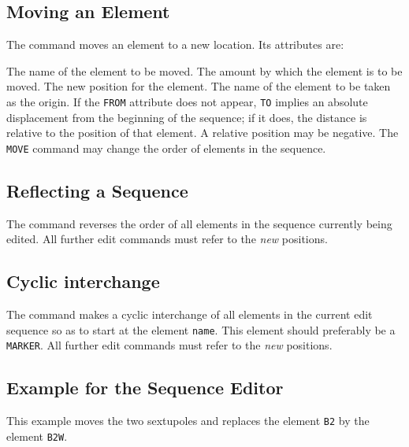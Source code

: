 \subsection{Moving an Element}
The command
moves an element to a new location.
Its attributes are:
\begin{mylist}
The name of the element to be moved.
The amount by which the element is to be moved.
The new position for the element.
The name of the element to be taken as the origin.
If the {\tt FROM} attribute does not appear,
{\tt TO} implies an absolute displacement from the beginning of the sequence;
if it does, the distance is relative to the position of that element.
A relative position may be negative.
The {\tt MOVE} command may change the order of elements in the sequence.
\end{mylist}
 
\subsection{Reflecting a Sequence}
The command
reverses the order of all elements in the sequence currently being
edited.
All further edit commands must refer to the {\em new} positions.
 
\subsection{Cyclic interchange}
The command
makes a cyclic interchange of all elements in the current edit
sequence so as to start at the element {\tt name}.
This element should preferably be a {\tt MARKER}.
All further edit commands must refer to the {\em new} positions.
 
\subsection{Example for the Sequence Editor}
This example moves the two sextupoles and replaces the element {\tt B2}
by the element {\tt B2W}.
 
